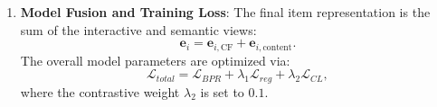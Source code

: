 \begin{enumerate}
    \begin{equation}
        \mathcal{L}_{CL} = -\sum_{i \in \mathcal{B}} \ln \frac{\exp\left(s(\mathbf{e}_{i, \text{CF}}, \mathbf{e}_{i, \text{content}}) / \tau\right)}{\sum_{j \in \mathcal{B}} \exp\left(s(\mathbf{e}_{i, \text{CF}}, \mathbf{e}_{j, \text{content}}) / \tau\right)},
    \end{equation}
    where $s(\cdot, \cdot)$ is the cosine similarity function, and $\tau = 0.2$ is the temperature hyperparameter.
    \item \textbf{Model Fusion and Training Loss}: The final item representation is the sum of the interactive and semantic views:
    \begin{equation}
        \mathbf{e}_i = \mathbf{e}_{i, \text{CF}} + \mathbf{e}_{i, \text{content}}.
    \end{equation}
    The overall model parameters are optimized via:
    \begin{equation}
        \mathcal{L}_{total} = \mathcal{L}_{BPR} + \lambda_1 \mathcal{L}_{reg} + \lambda_2 \mathcal{L}_{CL},
    \end{equation}
    where the contrastive weight $\lambda_2$ is set to $0.1$.
\end{enumerate}

